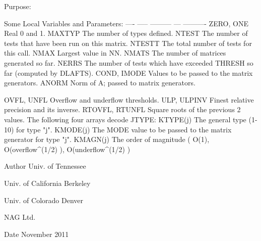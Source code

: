 \begin{DoxyParagraph}{Purpose\+: }
\begin{DoxyVerb}
       Some Local Variables and Parameters:
       ---- ----- --------- --- ----------
       ZERO, ONE       Real 0 and 1.
       MAXTYP          The number of types defined.
       NTEST           The number of tests that have been run
                       on this matrix.
       NTESTT          The total number of tests for this call.
       NMAX            Largest value in NN.
       NMATS           The number of matrices generated so far.
       NERRS           The number of tests which have exceeded THRESH
                       so far (computed by DLAFTS).
       COND, IMODE     Values to be passed to the matrix generators.
       ANORM           Norm of A; passed to matrix generators.

       OVFL, UNFL      Overflow and underflow thresholds.
       ULP, ULPINV     Finest relative precision and its inverse.
       RTOVFL, RTUNFL  Square roots of the previous 2 values.
               The following four arrays decode JTYPE:
       KTYPE(j)        The general type (1-10) for type "j".
       KMODE(j)        The MODE value to be passed to the matrix
                       generator for type "j".
       KMAGN(j)        The order of magnitude ( O(1),
                       O(overflow^(1/2) ), O(underflow^(1/2) )\end{DoxyVerb}
 
\end{DoxyParagraph}
\begin{DoxyAuthor}{Author}
Univ. of Tennessee 

Univ. of California Berkeley 

Univ. of Colorado Denver 

N\+A\+G Ltd. 
\end{DoxyAuthor}
\begin{DoxyDate}{Date}
November 2011 
\end{DoxyDate}
\hypertarget{group__complex16__eig_gaeb52cb23aa5a5fe5a884ba5413ea8d02}{}
